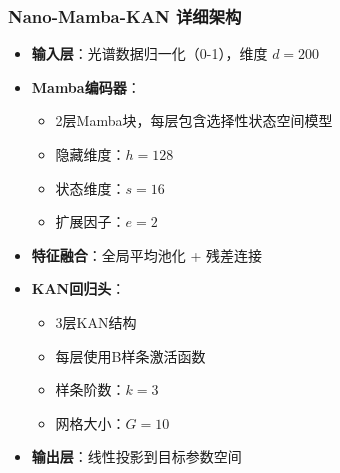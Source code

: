 \documentclass[12pt, a4paper]{article}
\begin{document}
\subsubsection{Nano-Mamba-KAN 详细架构}
\begin{itemize}
    \item \textbf{输入层}：光谱数据归一化（0-1），维度 $d=200$
    \item \textbf{Mamba编码器}：
        \begin{itemize}
            \item 2层Mamba块，每层包含选择性状态空间模型
            \item 隐藏维度：$h=128$
            \item 状态维度：$s=16$
            \item 扩展因子：$e=2$
        \end{itemize}
    \item \textbf{特征融合}：全局平均池化 + 残差连接
    \item \textbf{KAN回归头}：
        \begin{itemize}
            \item 3层KAN结构
            \item 每层使用B样条激活函数
            \item 样条阶数：$k=3$
            \item 网格大小：$G=10$
        \end{itemize}
    \item \textbf{输出层}：线性投影到目标参数空间
\end{itemize}
\end{document}
